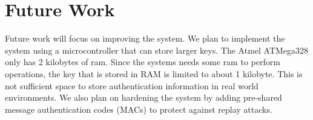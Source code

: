 \section{Future Work}\label{sec:future}
Future work will focus on improving the system.  We plan to implement the system using a microcontroller that can store larger keys.  The Atmel ATMega328 only has 2 kilobytes of ram.  Since the systems needs some ram to perform operations, the key that is stored in RAM is limited to about 1 kilobyte.  This is not sufficient space to store authentication information in real world environments.  We also plan on hardening the system by adding pre-shared message authentication codes (MACs) to protect against replay attacks.


